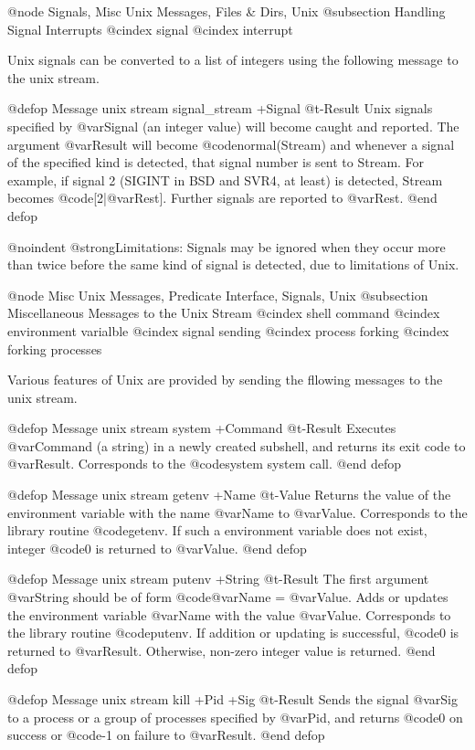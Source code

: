 {{{{@node Signals, Misc Unix Messages, Files & Dirs, Unix
@subsection Handling Signal Interrupts
@cindex signal
@cindex interrupt

Unix signals can be converted to a list of integers using the following
message to the unix stream.

@defop {Message} {unix stream} signal_stream +Signal @t{-}Result
Unix signals specified by @var{Signal} (an integer value) will become
caught and reported.  The argument @var{Result} will become
@code{normal(Stream)} and whenever a signal of the specified kind is
detected, that signal number is sent to Stream.  For example, if signal
2 (SIGINT in BSD and SVR4, at least) is detected, Stream becomes
@code{[2|@var{Rest}]}.  Further signals are reported to @var{Rest}.
@end defop

@noindent
@strong{Limitations:} Signals may be ignored when they occur more than
twice before the same kind of signal is detected, due to limitations of
Unix.

@node Misc Unix Messages, Predicate Interface, Signals, Unix
@subsection Miscellaneous Messages to the Unix Stream
@cindex shell command
@cindex environment varialble
@cindex signal sending
@cindex process forking
@cindex forking processes

Various features of Unix are provided by sending the fllowing messages
to the unix stream.

@defop {Message} {unix stream} system +Command @t{-}Result
Executes @var{Command} (a string) in a newly created subshell, and
returns its exit code to @var{Result}.  Corresponds to the @code{system}
system call.
@end defop

@defop {Message} {unix stream} getenv +Name @t{-}Value
Returns the value of the environment variable with the name @var{Name}
to @var{Value}.  Corresponds to the library routine @code{getenv}.  If
such a environment variable does not exist, integer @code{0} is returned to
@var{Value}.
@end defop

@defop {Message} {unix stream} putenv +String @t{-}Result
The first argument @var{String} should be of form @code{@var{Name} =
@var{Value}}.  Adds or updates the environment variable @var{Name} with
the value @var{Value}.  Corresponds to the library routine
@code{putenv}.  If addition or updating is successful, @code{0} is returned to
@var{Result}.  Otherwise, non-zero integer value is returned.
@end defop

@defop {Message} {unix stream} kill +Pid +Sig @t{-}Result
Sends the signal @var{Sig} to a process or a group of processes
specified by @var{Pid}, and returns @code{0} on success or @code{-1} on
failure to @var{Result}.
@end defop

}}}}
